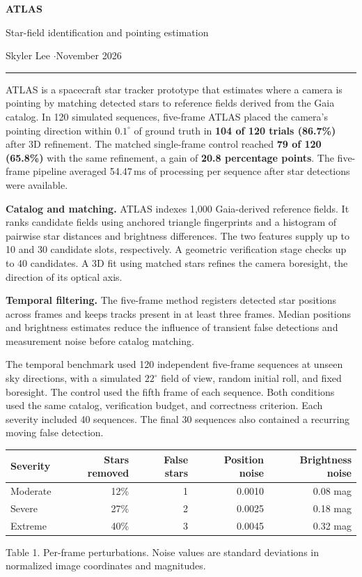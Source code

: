\documentclass[11pt,letterpaper]{article}
\newcommand{\reportsection}[1]{\par\medskip{\large\sffamily\bfseries\color{accent}#1}\par\nobreak\smallskip}
\newcommand{\figurecaption}[1]{\par{\small\color{muted}#1}\par}
\begin{document}
\thispagestyle{fancy}
{\sffamily\bfseries\fontsize{35}{39}\selectfont ATLAS\par}
{\sffamily\fontsize{20}{24}\selectfont Star-field identification and pointing estimation\par}
\vspace{7pt}
{\sffamily\color{muted}Skyler Lee \enspace$\cdot$\enspace November 2026\par}
\vspace{12pt}
{\color{accent}\rule{\linewidth}{1.2pt}}

\reportsection{Abstract}
ATLAS is a spacecraft star tracker prototype that estimates where a camera is
pointing by matching detected stars to reference fields derived from the Gaia
catalog. In 120 simulated sequences, five-frame ATLAS placed the camera's
pointing direction within \(0.1^\circ\) of ground truth in \textbf{104 of 120
trials (86.7\%)} after 3D refinement. The matched single-frame control reached
\textbf{79 of 120 (65.8\%)} with the same refinement, a gain of
\textbf{20.8 percentage points}. The five-frame pipeline averaged 54.47\,ms
of processing per sequence after star detections were available.

\reportsection{1. Method}
\textbf{Catalog and matching.} ATLAS indexes 1,000 Gaia-derived reference
fields. It ranks candidate fields using anchored triangle fingerprints and
a histogram of pairwise star distances and brightness differences. The two
features supply up to 10 and 30 candidate slots, respectively. A geometric
verification stage checks up to 40 candidates. A 3D fit using matched stars
refines the camera boresight, the direction of its optical axis.

\textbf{Temporal filtering.} The five-frame method registers detected star
positions across frames and keeps tracks present in at least three frames.
Median positions and brightness estimates reduce the influence of transient
false detections and measurement noise before catalog matching.

\reportsection{2. Experimental design}
The temporal benchmark used 120 independent five-frame sequences at unseen
sky directions, with a simulated \(22^\circ\) field of view, random initial roll,
and fixed boresight. The control used the fifth frame of each sequence. Both
conditions used the same catalog, verification budget, and correctness criterion.
Each severity included 40 sequences. The final 30 sequences also contained
a recurring moving false detection.

\smallskip
\begin{tabular*}{\linewidth}{@{\extracolsep{\fill}}lrrrr@{}}
\toprule
\textbf{Severity} & \textbf{Stars removed} & \textbf{False stars} &
  \textbf{Position noise} & \textbf{Brightness noise} \\
\midrule
Moderate & 12\% & 1 & 0.0010 & 0.08 mag \\
Severe   & 27\% & 2 & 0.0025 & 0.18 mag \\
Extreme  & 40\% & 3 & 0.0045 & 0.32 mag \\
\bottomrule
\end{tabular*}
\figurecaption{Table 1. Per-frame perturbations. Noise values are standard deviations in normalized image coordinates and magnitudes.}
\end{document}
